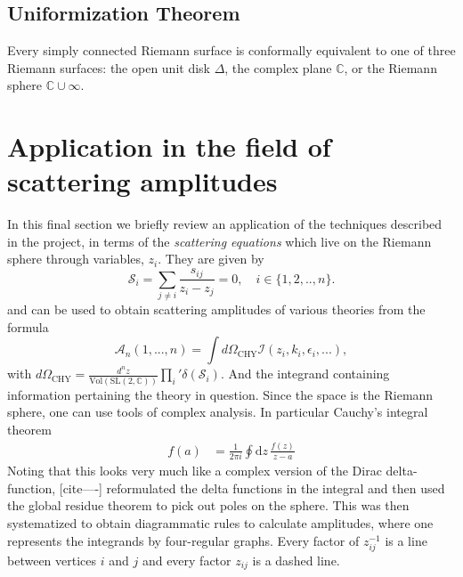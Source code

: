 \documentclass[lettersize,11pt]{article}
\begin{document}
\subsection{Uniformization Theorem}
	Every simply connected Riemann surface is conformally equivalent to one of three Riemann surfaces: the open unit disk $\Delta$, the complex plane $\mathds{C}$, or the Riemann sphere $\mathds{C}\cup \infty$.
\section{Application in the field of scattering amplitudes}
In this final section we briefly review an application of the techniques described in the project, in terms of the \textit{scattering equations} which live on the Riemann sphere through variables, $z_i$. They are given by
\begin{equation}
	\mathcal{S}_i=\sum_{j\neq i}\frac{s_{ij}}{z_i-z_j}=0,\quad i\in\{1,2,..,n\}.	\label{ScatteringEquations}
\end{equation}
and can be used to obtain scattering amplitudes of various theories from the formula
\begin{equation}
	\mathcal{A}_n(1,...,n)=\int d\Omega_{\text{CHY}} \mathcal{I}(z_i,k_i,\epsilon_i,...), \label{CHYformula1}
\end{equation}
with $ d\Omega_{\text{CHY}}=\frac{d^nz}{\text{Vol}(\text{SL}(2,\mathbb{C}))}\prod_{i}'\delta(\mathcal{S}_i) $. And the integrand containing information pertaining the theory in question.
Since the space is the Riemann sphere, one can use tools of complex analysis. In particular Cauchy's integral theorem
\begin{equation}
	\begin{aligned}
		f(a)&=\frac{1}{2\pi i}\oint \text{d}z\,\frac{f(z)}{z-a}
	\end{aligned}
\end{equation}
Noting that this looks very much like a complex version of the Dirac delta-function, [cite----] reformulated the delta functions in the integral and then used the global residue theorem to pick out poles on the sphere. This was then systematized to obtain diagrammatic rules to calculate amplitudes, where one represents the integrands by four-regular graphs. Every factor of $ z_{ij}^{-1} $ is a line between vertices $ i $ and $ j $ and every factor $ z_{ij} $ is a dashed line. 
\end{document}
